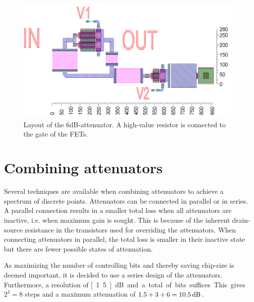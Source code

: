 		\begin{figure}[h!]
			\centering
			\includegraphics[width=1.0\textwidth]{fig/attenuators/tee_att_layout_6dB}
			\caption[Layout of a tee-attenuator]{Layout of the 6dB-attenuator.  A high-value resistor is connected to the gate of the FETs.\scalemum}\label{fig:tee_att_layout}
		\end{figure}
		
		
			

	\section{Combining attenuators}

		Several techniques are available when combining attenuators to achieve a spectrum of discrete points. Attenuators can be connected in parallel or in series. A parallel connection results in a smaller total loss when all attenuators are inactive, i.e. when maximum gain is sought. This is because of the inherent drain-source resistance in the transistors used for overriding the attenuators. When connecting attenuators in parallel, the total loss is smaller in their inactive state but there are fewer possible states of attenuation.

		As maximizing the number of controlling bits and thereby saving chip-size is deemed important, it is decided to use a series design of the attenuators. Furthermore, a resolution of \unit[1.5]{dB} and a total of \unit[3]{bits} suffices. This gives $2^3=8$ steps and a maximum attenuation of $1.5+3+6=\unit[10.5]{dB}$.

